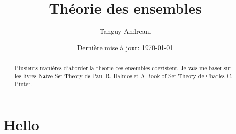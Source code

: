 \documentclass[fleqn,a4paper,nobib]{tufte-handout}
\title{Théorie des ensembles}
\author{Tanguy Andreani}
\date{Dernière mise à jour: \today}
\begin{document}
\maketitle

\begin{abstract}
    Plusieurs manières d'aborder la théorie des ensembles 
    coexistent. Je vais me baser sur les livres \underline{Naive
    Set Theory} de Paul R. Halmos et \underline{A Book of Set
    Theory} de Charles C. Pinter.
\end{abstract}

\tableofcontents

\section{Hello}
\end{document}
